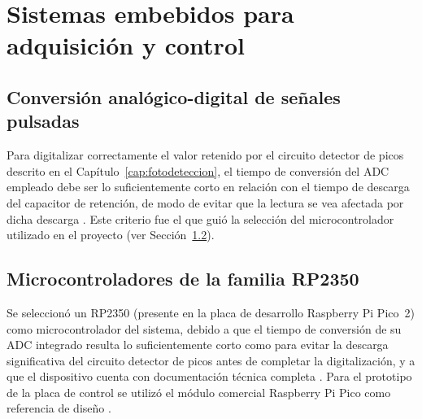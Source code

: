 \chapter{Sistemas embebidos para adquisici\'on y control}
\label{cap:sistemas_embebidos}

\section{Conversi\'on anal\'ogico-digital de se\~nales pulsadas}
\label{sec:adc_pulsadas}

Para digitalizar correctamente el valor retenido por el circuito
detector de picos descrito en el Cap\'itulo~\ref{cap:fotodeteccion}, el
tiempo de conversi\'on del ADC empleado debe ser lo suficientemente
corto en relaci\'on con el tiempo de descarga del capacitor de
retenci\'on, de modo de evitar que la lectura se vea afectada por dicha
descarga \cite{informeEneFeb2026}. Este criterio fue el que gui\'o la
selecci\'on del microcontrolador utilizado en el proyecto (ver
Secci\'on~\ref{sec:rp2350}).


\section{Microcontroladores de la familia RP2350}
\label{sec:rp2350}

Se seleccion\'o un RP2350 (presente en la placa de desarrollo Raspberry
Pi Pico~2) como microcontrolador del sistema, debido a que el tiempo de
conversi\'on de su ADC integrado resulta lo suficientemente corto como
para evitar la descarga significativa del circuito detector de picos
antes de completar la digitalizaci\'on, y a que el dispositivo cuenta
con documentaci\'on t\'ecnica completa \cite{informeEneFeb2026}. Para el
prototipo de la placa de control se utiliz\'o el m\'odulo comercial
Raspberry Pi Pico como referencia de dise\~no \cite{kicad_hsrl}.


